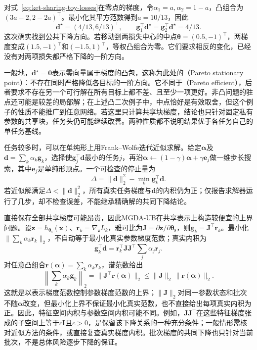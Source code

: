 对式~\eqref{eq:ket-sharing-toy-losses}在零点的梯度，令$\alpha_1=a,\alpha_2=1-a$，凸组合为$(3a-2,2-2a)^{\top}$。最小化其平方范数得到$a=10/13$，因此
\begin{equation}
  \bm d^\star=(4/13,6/13)^{\top},
  \qquad
  \bm g_1^{\top}\bm d^\star
  =\bm g_2^{\top}\bm d^\star
  =4/13.
  \label{eq:ket-sharing-mgda-numbers}
\end{equation}
这次确实找到公共下降方向。若移动到两损失中心的中点$\bm\theta=(0.5,-1)^{\top}$，两梯度变成$(1.5,-1)^{\top}$和$(-1.5,1)^{\top}$，等权凸组合为零。它们要求相反的变化，已经没有对两项损失都严格下降的一阶方向。

一般地，$\bm d^\star=\bm0$表示零向量属于梯度的凸包，这称为此处的（Pareto stationary point）：不存在同时严格降低各目标的一阶方向。它不同于（Pareto efficient），后者要求不存在另一个可行解在所有目标上都不差、且至少一项更好。非凸问题的驻点还可能是较差的局部解；在上述凸二次例子中，中点恰好是有效取舍，但这个例子的性质不能推广到任意网络。若这里只计算共享块梯度，结论也只针对固定私有参数的共享块，任务头仍可能继续改善。两种性质都不说明结果优于各任务自己的单任务基线。

任务较多时，可以在单纯形上用Frank--Wolfe迭代近似求解。给定$\bm\alpha$及$\bm d=\sum_k\alpha_k\bm g_k$，选择使$\bm g_j^{\top}\bm d$最小的任务$j$，再沿$\bm\alpha\leftarrow(1-\gamma)\bm\alpha+\gamma\bm e_j$做一维步长搜索，其中$\bm e_j$是单纯形顶点。一个可检查的停止量为
\begin{equation}
  \Delta=\|\bm d\|_2^2-\min_k\bm g_k^{\top}\bm d.
\end{equation}
若近似解满足$\Delta<\|\bm d\|_2^2$，所有真实任务梯度与$\bm d$的内积仍为正；仅报告求解器运行了几步，却不检查误差，不能继承精确解的共同下降结论。

直接保存全部共享梯度可能昂贵，因此MGDA-UB在共享表示上构造较便宜的上界问题。设$\bm z=h_{\bm{\theta}_{\mathrm s}}(\bm x)$、$\bm r_k=\nabla_{\bm z}L_k$，雅可比为$\bm J=\partial\bm z/\partial\bm{\theta}_{\mathrm s}$，则$\bm g_k=\bm J^{\top}\bm r_k$。最小化$\|\sum_k\alpha_k\bm r_k\|_2$，不自动等于最小化真实参数梯度范数；真实内积为
\begin{equation}
  \bm g_k^{\top}\bm d
  =\bm r_k^{\top}\bm J\bm J^{\top}
    \sum_j\alpha_j\bm r_j.
  \label{eq:ket-sharing-mgda-feature-metric}
\end{equation}
对任意凸组合$\bm r(\bm\alpha)=\sum_k\alpha_k\bm r_k$，谱范数给出
\[
  \left\|\sum_k\alpha_k\bm g_k\right\|_2
  =\|\bm J^\top\bm r(\bm\alpha)\|_2
  \leq\|\bm J\|_2\,\|\bm r(\bm\alpha)\|_2.
\]
这就是以表示梯度范数控制参数梯度范数的上界；$\|\bm J\|_2$对同一参数状态和批次不随$\bm\alpha$改变，但最小化上界不保证最小化真实范数，也不直接给出每项真实内积为正。因此，特征空间内积与参数空间内积可能不同。例如，$\bm J\bm J^{\top}$在这些特征梯度张成的子空间上等于$c\bm I$且$c>0$，是保留该下降关系的一种充分条件；一般情形需核对近似方法的条件，或直接复查真实梯度内积。批次梯度的共同下降也只针对当前批次，不是总体风险逐步下降的保证。

